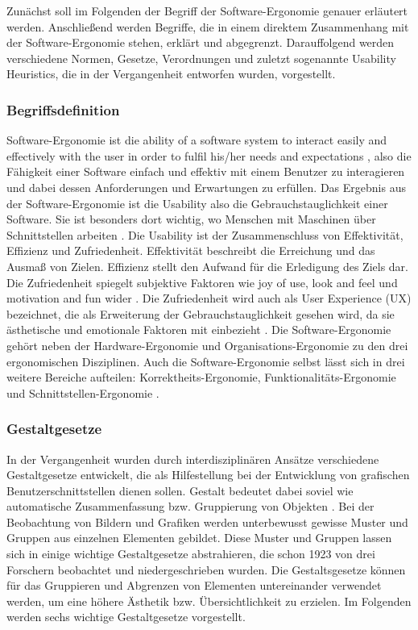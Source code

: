 Zunächst soll im Folgenden der Begriff der Software-Ergonomie genauer erläutert werden. Anschließend werden Begriffe, die in einem direktem Zusammenhang mit der Software-Ergonomie stehen, erklärt und abgegrenzt. Darauffolgend werden verschiedene Normen, Gesetze, Verordnungen und zuletzt sogenannte Usability Heuristics, die in der Vergangenheit entworfen wurden, vorgestellt.

\subsubsection{Begriffsdefinition}
Software-Ergonomie ist die \glqq ability of a software system to interact easily and effectively with the user in order to fulfil his/her needs and expectations\grqq{} \citep[4]{Oppermann1988einfuehrung}, also die Fähigkeit einer Software einfach und effektiv mit einem Benutzer zu interagieren und dabei dessen Anforderungen und Erwartungen zu erfüllen. Das Ergebnis aus der Software-Ergonomie ist die Usability also die Gebrauchstauglichkeit einer Software. Sie ist besonders dort wichtig, wo Menschen mit Maschinen über Schnittstellen arbeiten \citep[vgl.][]{usabilityDe}. Die Usability ist der Zusammenschluss von Effektivität, Effizienz und Zufriedenheit. Effektivität beschreibt die Erreichung und das Ausmaß von Zielen. Effizienz stellt den Aufwand für die Erledigung des Ziels dar. Die Zufriedenheit spiegelt subjektive Faktoren wie \glqq joy of use\grqq{}, \glqq look and feel\grqq{} und \glqq motivation and fun\grqq{} wider \citep[vgl.][]{Holzinger2011human}. Die Zufriedenheit wird auch als User Experience (UX) bezeichnet, die als Erweiterung der Gebrauchstauglichkeit gesehen wird, da sie ästhetische und emotionale Faktoren mit einbezieht \citep[vgl.][]{usabilityDe}. Die Software-Ergonomie gehört neben der Hardware-Ergonomie und Organisations-Ergonomie zu den drei ergonomischen Disziplinen. Auch die Software-Ergonomie selbst lässt sich in drei weitere Bereiche aufteilen: Korrektheits-Ergonomie, Funktionalitäts-Ergonomie und Schnittstellen-Ergonomie \citep[vgl.][]{Oppermann1988einfuehrung}.

\subsubsection{Gestaltgesetze}
In der Vergangenheit wurden durch interdisziplinären Ansätze verschiedene Gestaltgesetze entwickelt, die als Hilfestellung bei der Entwicklung von grafischen Benutzerschnittstellen dienen sollen. Gestalt bedeutet dabei soviel wie automatische Zusammenfassung bzw. Gruppierung von Objekten \citep[vgl.][59]{Dahm2006}. Bei der Beobachtung von Bildern und Grafiken werden unterbewusst gewisse Muster und Gruppen aus einzelnen Elementen gebildet. Diese Muster und Gruppen lassen sich in einige wichtige Gestaltgesetze abstrahieren, die schon 1923 von drei Forschern beobachtet und niedergeschrieben wurden. Die Gestaltsgesetze können für das Gruppieren und Abgrenzen von Elementen untereinander verwendet werden, um eine höhere Ästhetik bzw. Übersichtlichkeit zu erzielen. Im Folgenden werden sechs wichtige Gestaltgesetze vorgestellt.

